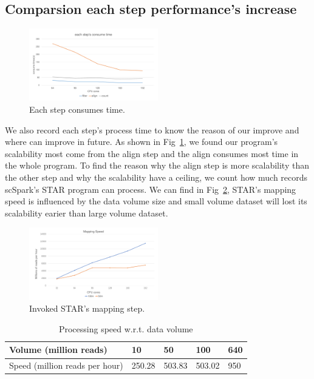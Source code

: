 \documentclass[conference]{IEEEtran}
\begin{document}
\subsection{Comparsion each step performance's increase}
\begin{figure}
  \includegraphics[width=0.5\textwidth]{fig5.pdf}
  \caption{Each step consumes time.} \label{fig5}
\end{figure}
We also record each step's process time to know the reason of our improve and where can improve in future.
As shown in Fig~\ref{fig5}, we found our program's scalability most come from the align step and the align consumes most time in the whole program.
To find the reason why the align step is more scalability than the other step and why the scalability have a ceiling, we count how much records scSpark's STAR program can process.
We can find in Fig~\ref{fig6}, STAR's mapping speed is influenced by the data volume size and small volume dataset will lost its scalability earier than large volume dataset.
\begin{figure}
  \includegraphics[width=0.5\textwidth]{fig6.pdf}
  \caption{Invoked STAR's mapping step.} \label{fig6}
\end{figure}

\begin{table}
    \centering
    \caption{Processing speed w.r.t. data volume}\label{tab3}
    \begin{tabular}{|l | l | l | l | l|}
    \hline
    Volume (million reads) & 10 & 50 & 100 & 640 \\
    \hline
    Speed (million reads per hour) & 250.28 & 503.83 & 503.02 & 950 \\
    \hline
    \end{tabular}
  \end{table}
  
\end{document}
